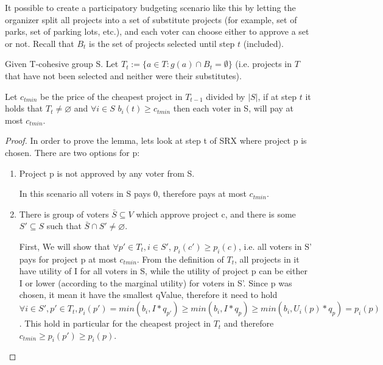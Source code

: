 \documentclass[runningheads]{llncs}
\begin{document}
It possible to create a participatory budgeting scenario like this by letting the organizer split all projects into a set of substitute projects (for example, set of parks, set of parking lots, etc.), and each voter can choose either to approve a set or not. Recall that $B_t$ is the set of projects selected until step $t$ (included).


\begin{lemma}\label{lemma:substitutes}
Given T-cohesive group S.  Let $T_t:=\{a\in T: g(a)\cap B_t = \emptyset\}$ (i.e. projects in $T$ that have not been selected and neither were their substitutes).




Let $c_{tmin}$ be the price of the cheapest project in $T_{t-1}$ divided by $|S|$,
if at step $t$ it holds that $T_t\neq\varnothing$ and $\forall i\in S$ $b_i(t)\geq c_{tmin}$ then each voter in S, will pay at most $c_{tmin}$.

\end{lemma}

\begin{proof}
In order to prove the lemma, lets look at step t of SRX where project p is chosen. There are two options for p:

\begin{enumerate}
    \item Project p is not approved by any voter from S.
    
    In this scenario all voters in S pays 0, therefore pays at most $c_{tmin}$.
    
    \item There is group of voters $\bar{S} \subseteq V$ which approve project c, and there is some $S'\subseteq S$ such that $\bar{S} \cap S'\neq \varnothing$.
    
    First, We will show that $\forall p'\in T_t, i\in S'$, $p_i(c')\geq p_i(c)$, i.e. all voters in S' pays for project p at most $c_{tmin}$.
    From the definition of $T_t$, all projects in it have utility of I for all voters in S, while the utility of project p can be either I or lower (according to the marginal utility) for voters in S'. Since p was chosen, it mean it have the smallest qValue, therefore it need to hold $\forall i\in S', p'\in T_t, p_i(p')=min(b_i,I*q_{p'})\geq min(b_i,I*q_p)\geq min(b_i,U_i(p)*q_p)=p_i(p)$. This hold in particular for the cheapest project in $T_t$ and therefore $c_{tmin}\geq p_i(p')\geq p_i(p)$.
\end{enumerate}
\end{proof}
\end{document}
